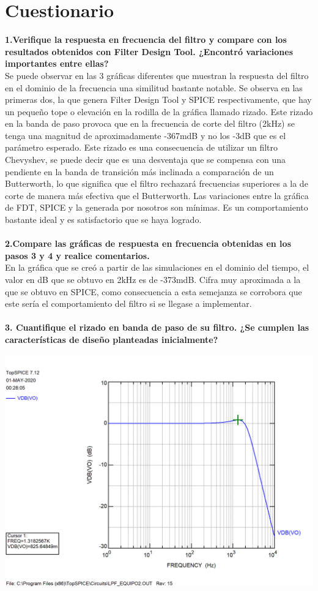 \documentclass[12pt]{article}
\begin{document}
\section{Cuestionario}
\textbf{1.Verifique la respuesta en frecuencia del filtro y compare con los resultados obtenidos con Filter Design Tool. ¿Encontró variaciones importantes entre ellas?}
\\
Se puede observar en las 3 gráficas diferentes que muestran la respuesta del filtro en el dominio de la frecuencia una similitud bastante notable. Se observa en las primeras dos, la que genera Filter Design Tool y SPICE respectivamente, que hay un pequeño tope o elevación en la rodilla de la gráfica llamado rizado. Este rizado en la banda de paso provoca que en la frecuencia de corte del filtro (2kHz) se tenga una magnitud de aproximadamente -367mdB y no los -3dB que es el parámetro esperado. Este rizado es una consecuencia de utilizar un filtro Chevyshev, se puede decir que es una desventaja que se compensa con una pendiente en la banda de transición más inclinada a comparación de un Butterworth, lo que significa que el filtro rechazará frecuencias superiores a la de corte de manera más efectiva que el Butterworth. Las variaciones entre la gráfica de FDT, SPICE y la generada por nosotros son mínimas. Es un comportamiento bastante ideal y es satisfactorio que se haya logrado.
\\
\\
\textbf{2.Compare las gráficas de respuesta en frecuencia obtenidas en los pasos 3 y 4 y realice comentarios.}
\\
En la gráfica que se creó a partir de las simulaciones en el dominio del tiempo, el valor en dB que se obtuvo en 2kHz es de -373mdB. Cifra muy aproximada a la que se obtuvo en SPICE, como consecuencia a esta semejanza se corrobora que este sería el comportamiento del filtro si se llegase a implementar. 
\\
\\
\textbf{3. Cuantifique el rizado en banda de paso de su filtro. ¿Se cumplen las características de diseño planteadas  inicialmente?}
\begin{center}
    \centering
    \includegraphics[scale=0.2]{Rizado_LPF.png}
\end{center}
\end{document}
